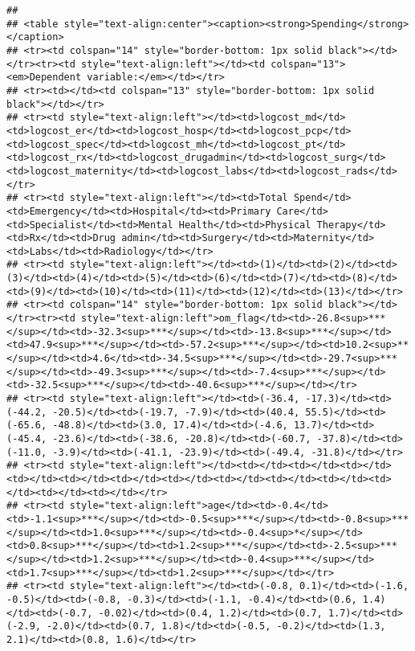 \documentclass[]{article}
\begin{document}
\begin{verbatim}
## 
## <table style="text-align:center"><caption><strong>Spending</strong></caption>
## <tr><td colspan="14" style="border-bottom: 1px solid black"></td></tr><tr><td style="text-align:left"></td><td colspan="13"><em>Dependent variable:</em></td></tr>
## <tr><td></td><td colspan="13" style="border-bottom: 1px solid black"></td></tr>
## <tr><td style="text-align:left"></td><td>logcost_md</td><td>logcost_er</td><td>logcost_hosp</td><td>logcost_pcp</td><td>logcost_spec</td><td>logcost_mh</td><td>logcost_pt</td><td>logcost_rx</td><td>logcost_drugadmin</td><td>logcost_surg</td><td>logcost_maternity</td><td>logcost_labs</td><td>logcost_rads</td></tr>
## <tr><td style="text-align:left"></td><td>Total Spend</td><td>Emergency</td><td>Hospital</td><td>Primary Care</td><td>Specialist</td><td>Mental Health</td><td>Physical Therapy</td><td>Rx</td><td>Drug admin</td><td>Surgery</td><td>Maternity</td><td>Labs</td><td>Radiology</td></tr>
## <tr><td style="text-align:left"></td><td>(1)</td><td>(2)</td><td>(3)</td><td>(4)</td><td>(5)</td><td>(6)</td><td>(7)</td><td>(8)</td><td>(9)</td><td>(10)</td><td>(11)</td><td>(12)</td><td>(13)</td></tr>
## <tr><td colspan="14" style="border-bottom: 1px solid black"></td></tr><tr><td style="text-align:left">om_flag</td><td>-26.8<sup>***</sup></td><td>-32.3<sup>***</sup></td><td>-13.8<sup>***</sup></td><td>47.9<sup>***</sup></td><td>-57.2<sup>***</sup></td><td>10.2<sup>**</sup></td><td>4.6</td><td>-34.5<sup>***</sup></td><td>-29.7<sup>***</sup></td><td>-49.3<sup>***</sup></td><td>-7.4<sup>***</sup></td><td>-32.5<sup>***</sup></td><td>-40.6<sup>***</sup></td></tr>
## <tr><td style="text-align:left"></td><td>(-36.4, -17.3)</td><td>(-44.2, -20.5)</td><td>(-19.7, -7.9)</td><td>(40.4, 55.5)</td><td>(-65.6, -48.8)</td><td>(3.0, 17.4)</td><td>(-4.6, 13.7)</td><td>(-45.4, -23.6)</td><td>(-38.6, -20.8)</td><td>(-60.7, -37.8)</td><td>(-11.0, -3.9)</td><td>(-41.1, -23.9)</td><td>(-49.4, -31.8)</td></tr>
## <tr><td style="text-align:left"></td><td></td><td></td><td></td><td></td><td></td><td></td><td></td><td></td><td></td><td></td><td></td><td></td><td></td></tr>
## <tr><td style="text-align:left">age</td><td>-0.4</td><td>-1.1<sup>***</sup></td><td>-0.5<sup>***</sup></td><td>-0.8<sup>***</sup></td><td>1.0<sup>***</sup></td><td>-0.4<sup>*</sup></td><td>0.8<sup>***</sup></td><td>1.2<sup>***</sup></td><td>-2.5<sup>***</sup></td><td>1.2<sup>***</sup></td><td>-0.4<sup>***</sup></td><td>1.7<sup>***</sup></td><td>1.2<sup>***</sup></td></tr>
## <tr><td style="text-align:left"></td><td>(-0.8, 0.1)</td><td>(-1.6, -0.5)</td><td>(-0.8, -0.3)</td><td>(-1.1, -0.4)</td><td>(0.6, 1.4)</td><td>(-0.7, -0.02)</td><td>(0.4, 1.2)</td><td>(0.7, 1.7)</td><td>(-2.9, -2.0)</td><td>(0.7, 1.8)</td><td>(-0.5, -0.2)</td><td>(1.3, 2.1)</td><td>(0.8, 1.6)</td></tr>

\end{verbatim}
\end{document}
